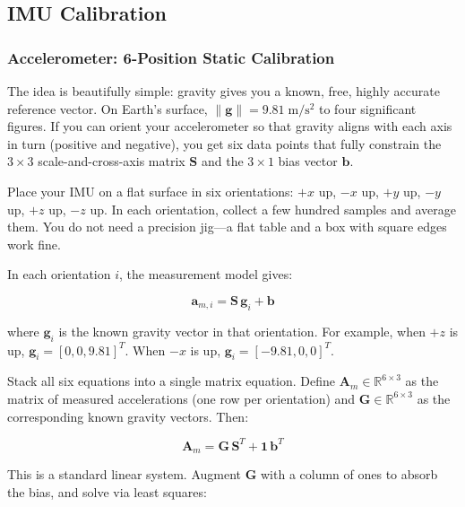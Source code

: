 \subsection{IMU Calibration}

\subsubsection{Accelerometer: 6-Position Static Calibration}

The idea is beautifully simple: gravity gives you a known, free, highly accurate reference vector. On Earth's surface, $\|\mathbf{g}\| = 9.81\;\mathrm{m/s^2}$ to four significant figures. If you can orient your accelerometer so that gravity aligns with each axis in turn (positive and negative), you get six data points that fully constrain the $3 \times 3$ scale-and-cross-axis matrix $\mathbf{S}$ and the $3 \times 1$ bias vector $\mathbf{b}$.

Place your IMU on a flat surface in six orientations: $+x$ up, $-x$ up, $+y$ up, $-y$ up, $+z$ up, $-z$ up. In each orientation, collect a few hundred samples and average them. You do not need a precision jig---a flat table and a box with square edges work fine.

In each orientation $i$, the measurement model gives:

\begin{equation}
\mathbf{a}_{m,i} = \mathbf{S} \, \mathbf{g}_i + \mathbf{b}
\end{equation}

where $\mathbf{g}_i$ is the known gravity vector in that orientation. For example, when $+z$ is up, $\mathbf{g}_i = [0, 0, 9.81]^T$. When $-x$ is up, $\mathbf{g}_i = [-9.81, 0, 0]^T$.

Stack all six equations into a single matrix equation. Define $\mathbf{A}_m \in \mathbb{R}^{6 \times 3}$ as the matrix of measured accelerations (one row per orientation) and $\mathbf{G} \in \mathbb{R}^{6 \times 3}$ as the corresponding known gravity vectors. Then:

\begin{equation}
\mathbf{A}_m = \mathbf{G} \, \mathbf{S}^T + \mathbf{1} \, \mathbf{b}^T
\end{equation}

This is a standard linear system. Augment $\mathbf{G}$ with a column of ones to absorb the bias, and solve via least squares:

